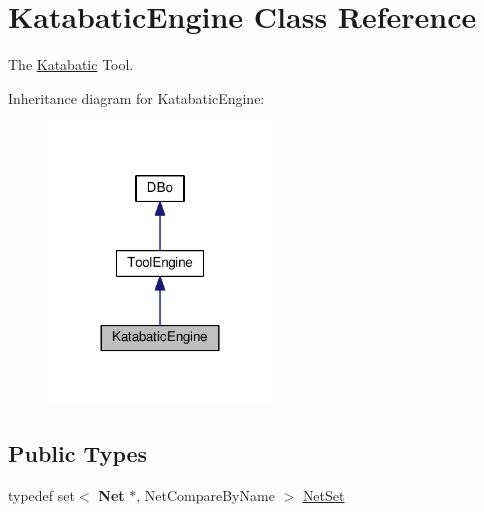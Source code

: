 \hypertarget{classKatabatic_1_1KatabaticEngine}{}\section{Katabatic\+Engine Class Reference}
\label{classKatabatic_1_1KatabaticEngine}


The \mbox{\hyperlink{namespaceKatabatic}{Katabatic}} Tool.  




Inheritance diagram for Katabatic\+Engine\+:\nopagebreak
\begin{figure}[H]
\begin{center}
\leavevmode
\includegraphics[width=168pt]{classKatabatic_1_1KatabaticEngine__inherit__graph}
\end{center}
\end{figure}
\subsection*{Public Types}
\begin{DoxyCompactItemize}
\item 
typedef set$<$ \textbf{ Net} $\ast$, Net\+Compare\+By\+Name $>$ \mbox{\hyperlink{classKatabatic_1_1KatabaticEngine_a92ed88f9aecd2f195089c4029fa8bcc7}{Net\+Set}}
\end{DoxyCompactItemize}
